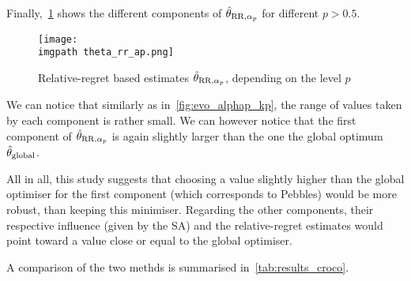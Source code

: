 \documentclass[../../Main_ManuscritThese.tex]{subfiles}
\newcommand\imgpath{/home/victor/acadwriting/Manuscrit/Text/Chapter5/img/}
\begin{document}
Finally,~\cref{fig:theta_rr_alpha} shows the different components of
$\hat{\theta}_{\mathrm{RR},\alpha_p}$ for different $p> 0.5$.
\begin{figure}[ht]
  \centering
  \texttt{[image: \\imgpath theta\_rr\_ap.png]}
  \caption{\label{fig:theta_rr_alpha} Relative-regret based estimates
    $\hat{\theta}_{\mathrm{RR}, \alpha_p}$, depending on the level $p$}
\end{figure}
We can notice that similarly as in~\cref{fig:evo_alphap_kp}, the range
of values taken by each component is rather small. We can however
notice that the first component of $\hat{\theta}_{\mathrm{RR}, \alpha_p}$
is again slightly larger than the one the global optimum
$\hat{\theta}_{\mathrm{global}}$.


All in all, this study suggests that choosing a value slightly higher
than the global optimiser for the first component (which corresponds
to Pebbles) would be more robust, than keeping this
minimiser. Regarding the other components, their respective influence
(given by the SA) and the relative-regret estimates would point toward
a value close or equal to the global optimiser.

A comparison of the two methds is summarised in~\cref{tab:results_croco}.
\end{document}
